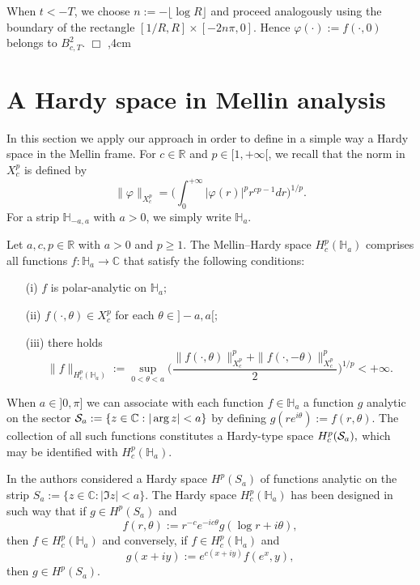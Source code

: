 \documentclass[amsmath,english,a4paper,graphicx,12pt]{article}
\begin{document}
When $t<-T$, we choose $n:= -\lfloor\log R\rfloor$ and proceed analogously using the boundary of the rectangle $[1/R, R]\times [-2n\pi, 0].$ 
Hence $\varphi(\cdot):= f(\cdot, 0)$ belongs to $B^2_{c,T}.$
\hfill $\Box$
,4cm

\section{A Hardy space in Mellin analysis}

In this section we apply our approach in order to define in a simple way a Hardy space in the Mellin frame. For $c \in \mathbb{R}$ and  
$p \in [1,+\infty[$,  we recall that the norm 
in $X^p_c$ is defined by
$$\|\varphi\|_{X^p_c}= \bigg(\int_0^{+\infty} |\varphi(r)|^p r^{cp-1}dr\bigg)^{1/p}.$$
For a strip $\mathbb{H}_{-a,a}$ with $a>0$, we simply write $\mathbb{H}_a.$ 
\begin{Definition}\label{Hardy}
Let $a, c, p \in \mathbb{R}$ with $a>0$ and $p\geq 1.$ The {\rm Mellin--Hardy space} $H^p_c(\mathbb{H}_a)$ comprises all functions $f : \mathbb{H}_a \rightarrow \mathbb{C}$ that satisfy the following 
conditions:
\begin{enumerate}
\item[(i)] $f$ is polar-analytic on $\mathbb{H}_a;$
\item[(ii)] $f(\cdot, \theta) \in X^p_c$ for each $\theta \in {]}-a,a{[};$
\item[(iii)] there holds
$$\|f\|_{H^p_c(\mathbb{H}_a)} := \sup_{0<\theta<a}\bigg(\frac{\|f(\cdot, \theta)\|^p_{X^p_c} + \|f(\cdot, -\theta)\|^p_{X^p_c}}{2}\bigg)^{1/p} < +\infty.$$
\end{enumerate}
\end{Definition}
When $a \in {]}0,\pi]$ we can associate with each function $f \in \mathbb{H}_a$ a function $g$ analytic on the sector 
${\cal S}_a:= \{z \in \mathbb{C}: |\arg z| < a\}$ by defining 
$g(re^{i\theta}):= f(r,\theta).$ The collection of all such functions constitutes a Hardy-type space $H^p_c({\cal S}_a),$ which may be identified 
with $H^p_c(\mathbb{H}_a).$

In \cite{BSS2} the authors considered a Hardy space $H^p(S_a)$ of functions analytic on the strip $S_a:=\{z \in \mathbb{C}: |\Im z| < a\}.$ The Hardy space $H^p_c(\mathbb{H}_a)$ has been designed in such way that if $g \in H^p(S_a)$ and 
$$f(r,\theta):= r^{-c}e^{-ic\theta}g(\log r + i\theta),$$
then $f \in H^p_c(\mathbb{H}_a)$ and conversely, if $f \in H^p_c(\mathbb{H}_a)$ and 
$$g(x+iy):= e^{c(x+iy)}f(e^x,y),$$
then $g \in H^p(S_a).$
\end{document}
